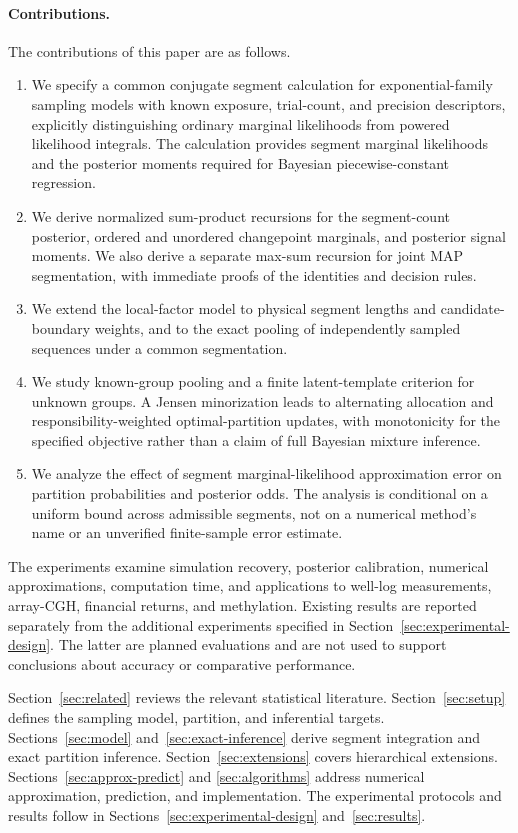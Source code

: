 \paragraph{Contributions.}
The contributions of this paper are as follows.
\begin{enumerate}
\item We specify a common conjugate segment calculation for exponential-family
  sampling models with known exposure, trial-count, and precision descriptors,
  explicitly distinguishing ordinary marginal likelihoods from powered
  likelihood integrals. The calculation provides segment marginal likelihoods
  and the posterior moments required for Bayesian piecewise-constant regression.
\item We derive normalized sum-product recursions for the segment-count
  posterior, ordered and unordered changepoint marginals, and posterior signal
  moments. We also derive a separate max-sum recursion for joint MAP
  segmentation, with immediate proofs of the identities and decision rules.
\item We extend the local-factor model to physical segment lengths and
  candidate-boundary weights, and to the exact pooling of independently sampled
  sequences under a common segmentation.
\item We study known-group pooling and a finite latent-template criterion for
  unknown groups. A Jensen minorization leads to alternating allocation and
  responsibility-weighted optimal-partition updates, with monotonicity for the
  specified objective rather than a claim of full Bayesian mixture inference.
\item We analyze the effect of segment marginal-likelihood approximation error
  on partition probabilities and posterior odds. The analysis is conditional
  on a uniform bound across admissible segments, not on a numerical method's
  name or an unverified finite-sample error estimate.
\end{enumerate}

The experiments examine simulation recovery, posterior calibration, numerical
approximations, computation time, and applications to well-log measurements,
array-CGH, financial returns, and methylation. Existing results are reported
separately from the additional experiments specified in
Section~\ref{sec:experimental-design}. The latter are planned evaluations and
are not used to support conclusions about accuracy or comparative performance.

Section~\ref{sec:related} reviews the relevant statistical literature.
Section~\ref{sec:setup} defines the sampling model, partition, and inferential
targets. Sections~\ref{sec:model} and~\ref{sec:exact-inference} derive segment
integration and exact partition inference. Section~\ref{sec:extensions}
covers hierarchical extensions. Sections~\ref{sec:approx-predict} and
\ref{sec:algorithms} address numerical approximation, prediction, and
implementation. The experimental protocols and results follow in
Sections~\ref{sec:experimental-design} and~\ref{sec:results}.
